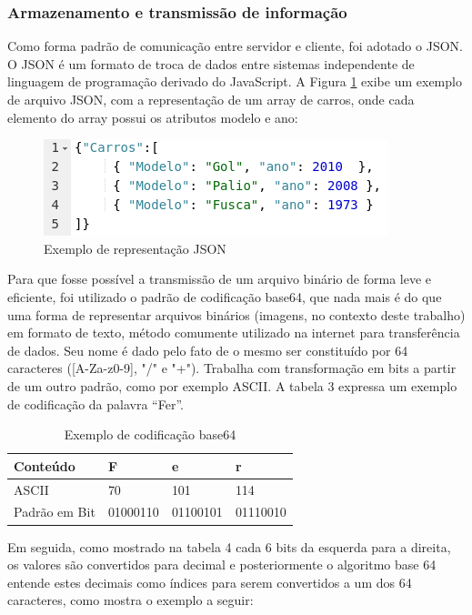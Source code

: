 \documentclass[12pt]{article}
\begin{document}
\subsubsection{Armazenamento e transmissão de informação}

Como forma padrão de comunicação entre servidor e cliente, foi adotado o JSON. O JSON é um formato de troca de dados entre sistemas independente de linguagem de programação derivado do JavaScript. A Figura \ref{fig:Figura4} exibe um exemplo de arquivo JSON, com a representação de um array de carros, onde cada elemento do array possui os atributos modelo e ano:

\begin{figure}[ht]
	\centering
	\includegraphics[width=.7\textwidth]{exemplo-json.png}
	\caption{Exemplo de representação JSON}
	\label{fig:Figura4}
\end{figure}

Para que fosse possível a transmissão de um arquivo binário de forma leve e eficiente, foi utilizado o padrão de codificação base64, que nada mais é do que uma forma de representar arquivos binários (imagens, no contexto deste trabalho) em formato de texto, método comumente utilizado na internet para transferência de dados.
Seu nome é dado pelo fato de o mesmo ser constituído por 64 caracteres ([A-Za-z0-9], "/" e "+"). Trabalha com transformação em bits a partir de um outro padrão, como por exemplo ASCII. A tabela 3 expressa um exemplo de codificação da palavra “Fer”.

\begin{table}[ht]
	\centering
	\caption{Exemplo de codificação base64}
	\label{tab:Table3}
	\smallskip
	\begin{tabular}{ |l|l|l|l| }
		\hline
		Conteúdo & F & e & r \\ \hline
		ASCII & 70 & 101 & 114 \\ \hline
		Padrão em Bit & 01000110 & 01100101 & 01110010\\ \hline
	\end{tabular}
\end{table}

Em seguida, como mostrado na tabela 4 cada 6 bits da esquerda para a direita, os valores são convertidos para decimal e posteriormente o algoritmo base 64 entende estes decimais como índices para serem convertidos a um dos 64 caracteres, como mostra o exemplo a seguir:
\end{document}
